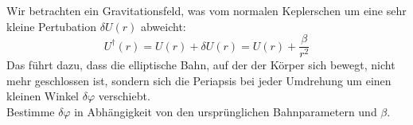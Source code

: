 \begin{Exercise}[label = viralthe, title = Periheldrehung, difficulty = 5, origin = Aaron Wild]
	Wir betrachten ein Gravitationsfeld, was vom normalen Keplerschen um eine sehr kleine Pertubation $\delta U\left(r\right)$ abweicht:
	\begin{equation}
		U^\dagger\left(r\right) = U\left(r\right) + \delta U\left(r\right) = U\left(r\right)+\frac{\beta}{r^2}
	\end{equation}
	Das führt dazu, dass die elliptische Bahn, auf der der Körper sich bewegt, nicht mehr geschlossen ist, sondern sich die Periapsis bei jeder Umdrehung um einen kleinen Winkel $\delta \varphi$ verschiebt. \\
	Bestimme $\delta \varphi$ in Abhängigkeit von den ursprünglichen Bahnparametern und $\beta$. 
	
\end{Exercise}
%
